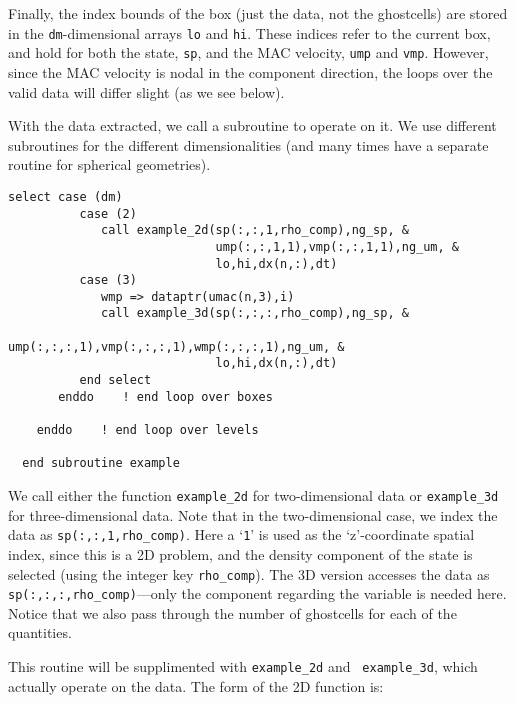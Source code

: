 Finally, the index bounds of the box (just the data, not the ghostcells) are 
stored in the {\tt dm}-dimensional arrays {\tt lo} and {\tt hi}.  These indices
refer to the current box, and hold for both the state, {\tt sp}, and the MAC
velocity, {\tt ump} and {\tt vmp}.  However, since the MAC velocity is nodal
in the component direction, the loops over the valid data will differ
slight (as we see below).

With the data extracted, we call a subroutine to operate on it.  We use
different subroutines for the different dimensionalities (and many times
have a separate routine for spherical geometries).
\begin{lstlisting}[language={[95]fortran},mathescape=false]
          select case (dm)
          case (2)
             call example_2d(sp(:,:,1,rho_comp),ng_sp, &
                             ump(:,:,1,1),vmp(:,:,1,1),ng_um, &
                             lo,hi,dx(n,:),dt)
          case (3)
             wmp => dataptr(umac(n,3),i)
             call example_3d(sp(:,:,:,rho_comp),ng_sp, &
                             ump(:,:,:,1),vmp(:,:,:,1),wmp(:,:,:,1),ng_um, &
                             lo,hi,dx(n,:),dt)
          end select
       enddo    ! end loop over boxes

    enddo    ! end loop over levels

  end subroutine example
\end{lstlisting}
\noindent We call either the function
{\tt example\_2d} for two-dimensional data or {\tt example\_3d}
for three-dimensional data.  Note that in the two-dimensional
case, we index the data as {\tt sp(:,:,1,rho\_comp)}.  Here a
`{\tt 1}' is used as the `z'-coordinate spatial index, since this
is a 2D problem, and the density component of the state is selected
(using the integer key {\tt rho\_comp}).  The 3D version accesses
the data as {\tt sp(:,:,:,rho\_comp)}---only the component regarding
the variable is needed here.  Notice that we also pass through
the number of ghostcells for each of the quantities.

This routine will be supplimented with {\tt example\_2d} and {\tt
example\_3d}, which actually operate on the data.  The form of 
the 2D function is:

